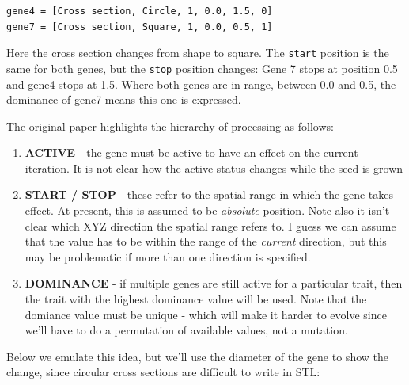 \documentclass[]{article}
\providecommand{\tightlist}{%
  \setlength{\itemsep}{0pt}\setlength{\parskip}{0pt}}
\begin{document}
\begin{verbatim}
gene4 = [Cross section, Circle, 1, 0.0, 1.5, 0]
gene7 = [Cross section, Square, 1, 0.0, 0.5, 1] 
\end{verbatim}

Here the cross section changes from shape to square. The \texttt{start}
position is the same for both genes, but the \texttt{stop} position
changes: Gene 7 stops at position 0.5 and gene4 stops at 1.5. Where both
genes are in range, between 0.0 and 0.5, the dominance of gene7 means
this one is expressed.

The original paper highlights the hierarchy of processing as follows:

\begin{enumerate}
\def\labelenumi{\arabic{enumi}.}
\tightlist
\item
  \textbf{ACTIVE} - the gene must be active to have an effect on the
  current iteration. It is not clear how the active status changes while
  the seed is grown
\item
  \textbf{START / STOP} - these refer to the spatial range in which the
  gene takes effect. At present, this is assumed to be \emph{absolute}
  position. Note also it isn't clear which XYZ direction the spatial
  range refers to. I guess we can assume that the value has to be within
  the range of the \emph{current} direction, but this may be problematic
  if more than one direction is specified.
\item
  \textbf{DOMINANCE} - if multiple genes are still active for a
  particular trait, then the trait with the highest dominance value will
  be used. Note that the domiance value must be unique - which will make
  it harder to evolve since we'll have to do a permutation of available
  values, not a mutation.
\end{enumerate}

Below we emulate this idea, but we'll use the diameter of the gene to
show the change, since circular cross sections are difficult to write in
STL:
\end{document}
